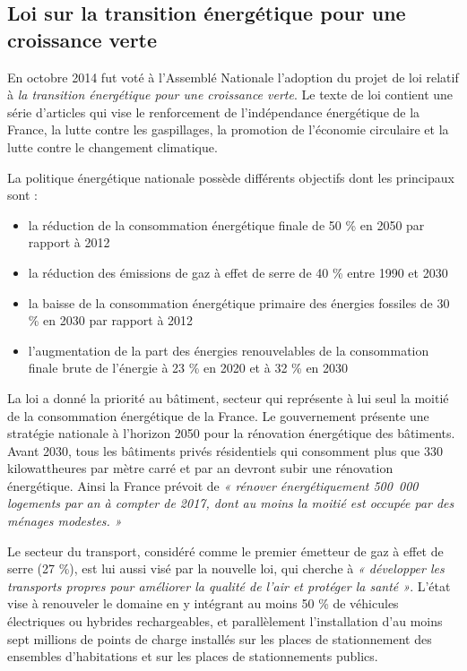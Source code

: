 \subsection{Loi sur la transition énergétique pour une croissance verte}


En octobre 2014 fut voté à l'Assemblé Nationale l’adoption du projet de loi relatif à \textit{la transition énergétique pour une croissance verte}. Le texte de loi contient une série d’articles qui vise le renforcement de l’indépendance énergétique de la France, la lutte contre les gaspillages, la promotion de l’économie circulaire et la lutte contre le changement climatique.


\bigbreak
La politique énergétique nationale possède différents objectifs dont les principaux sont \cite{loi_te} :
\begin{itemize}
  \item la réduction de la consommation énergétique finale de 50 \% en 2050 par rapport à 2012
  \item la réduction des émissions de gaz à effet de serre de 40 \% entre 1990 et 2030
  \item la baisse de la consommation énergétique primaire des énergies fossiles de 30 \% en 2030 par rapport à 2012
  \item l'augmentation de la part des énergies renouvelables de la consommation finale brute de l’énergie à 23 \% en 2020 et à 32 \% en 2030
\end{itemize}


\bigbreak
La loi a donné la priorité au bâtiment, secteur qui représente à lui seul la moitié de la consommation énergétique de la France. Le gouvernement présente une stratégie nationale à l’horizon 2050 pour la rénovation énergétique des bâtiments. Avant 2030, tous les bâtiments privés résidentiels qui consomment plus que 330 kilowattheures par mètre carré et par an devront subir une rénovation énergétique. Ainsi la France prévoit de \textit{« rénover énergétiquement 500~000 logements par an à compter de 2017, dont au moins la moitié est occupée par des ménages modestes. »}


\bigbreak
Le secteur du transport, considéré comme le premier émetteur de gaz à effet de serre (27 \%), est lui aussi visé par la nouvelle loi, qui cherche à \textit{« développer les transports propres pour améliorer la qualité de l’air et protéger la santé »}. L’état vise à renouveler le domaine en y intégrant au moins 50 \% de véhicules électriques ou hybrides rechargeables, et parallèlement l’installation d’au moins sept millions de points de charge installés sur les places de stationnement des ensembles d’habitations et sur les places de stationnements publics.


